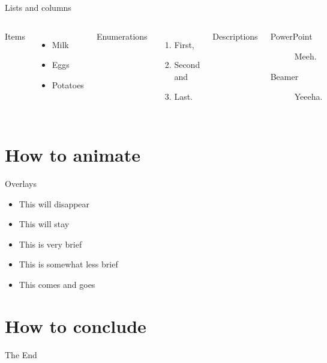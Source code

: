 \documentclass{beamer}
\begin{document}
\begin{frame}{Lists and columns}
  \begin{columns}[T, %
    onlytextwidth] %
    Items
    \begin{itemize}
    \item Milk
    \item Eggs
    \item Potatoes
    \end{itemize}

    Enumerations
    \begin{enumerate}
    \item First,
    \item Second and
    \item Last.
    \end{enumerate}

    Descriptions
    \begin{description}
    \item[PowerPoint] Meeh.
    \item[Beamer] Yeeeha.
    \end{description}
  \end{columns}
\end{frame}


\section{How to animate}

\begin{frame}{Overlays}
  \begin{itemize}
  \item<-2> This will disappear %
  \item<2-> This will \alert<5->{stay}%
  \item<3> This is very brief %
  \item<3-4> This is somewhat less brief %
  \item<2,4> This comes and goes %
  \end{itemize}
\end{frame}

\section{How to conclude}

\begin{frame}[noframenumbering] %
  \centering{}\Huge
  The End
\end{frame}
\end{document}
